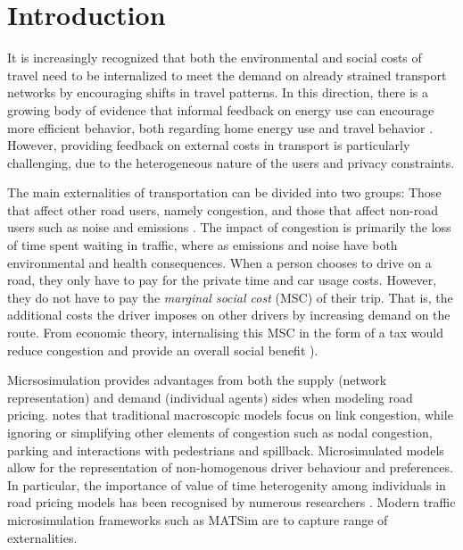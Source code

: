 \section{Introduction}

It is increasingly recognized that both the environmental and social costs of travel need to be internalized to meet the demand on already strained transport networks by encouraging shifts in travel patterns. 
In this direction, there is a growing body of evidence that informal feedback on energy use can encourage more efficient behavior, both regarding home energy use \citep{faruqui2010impact} and travel behavior \citep{taniguchi2003psychological, fujii2006determinants}.
However, providing feedback on external costs in transport is particularly challenging, due to the heterogeneous nature of the users and privacy constraints.

The main externalities of transportation can be divided into two groups: Those that affect other road users, namely congestion, and those that affect non-road users such as noise and emissions \cite{button2004rationale}.
The impact of congestion is primarily the loss of time spent waiting in traffic, where as emissions and noise have both environmental and health consequences.
When a person chooses to drive on a road, they only have to pay for the private time and car usage costs.
However, they do not have to pay the \textit{marginal social cost} (MSC) of their trip.
That is, the additional costs the driver imposes on other drivers by increasing demand on the route.
From economic theory, internalising this MSC in the form of a tax would reduce congestion and provide an overall social benefit \cite{arnott1994economics, pigou2013economics}). 

Micrsosimulation provides advantages from both the supply (network representation) and demand (individual agents) sides when modeling road pricing.
\citet{arnott2001economic} notes that traditional macroscopic models focus on link congestion, while ignoring or simplifying other elements of congestion such as nodal congestion, parking and interactions with pedestrians and spillback.
Microsimulated models allow for the representation of non-homogenous driver behaviour and preferences.
In particular, the importance of value of time heterogenity among individuals in road pricing models has been recognised by numerous researchers \citet{small2001value, verhoef2004product}.
Modern traffic microsimulation frameworks such as MATSim \cite{balmer2009matsim} are to capture range of externalities.

